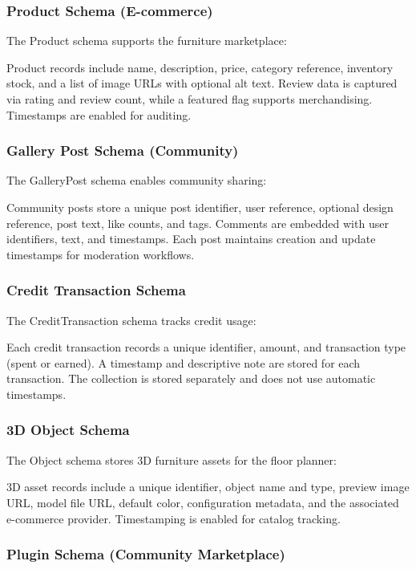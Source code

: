\subsubsection{Product Schema (E-commerce)}

The Product schema supports the furniture marketplace:

Product records include name, description, price, category reference, inventory stock, and a list of image URLs with optional alt text. Review data is captured via rating and review count, while a featured flag supports merchandising. Timestamps are enabled for auditing.

\subsubsection{Gallery Post Schema (Community)}

The GalleryPost schema enables community sharing:

Community posts store a unique post identifier, user reference, optional design reference, post text, like counts, and tags. Comments are embedded with user identifiers, text, and timestamps. Each post maintains creation and update timestamps for moderation workflows.

\subsubsection{Credit Transaction Schema}

The CreditTransaction schema tracks credit usage:

Each credit transaction records a unique identifier, amount, and transaction type (spent or earned). A timestamp and descriptive note are stored for each transaction. The collection is stored separately and does not use automatic timestamps.

\subsubsection{3D Object Schema}

The Object schema stores 3D furniture assets for the floor planner:

3D asset records include a unique identifier, object name and type, preview image URL, model file URL, default color, configuration metadata, and the associated e-commerce provider. Timestamping is enabled for catalog tracking.

\subsubsection{Plugin Schema (Community Marketplace)}


